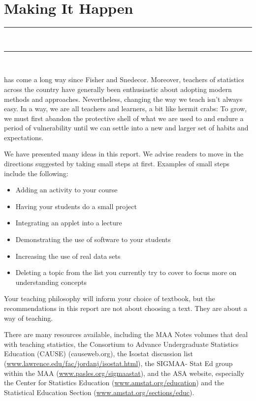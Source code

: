 \chapter{Making It Happen}
\vspace{-.53in}
   \noindent\color{graylight}\rule[0cm]{3.25in}{0.03cm} \\
    \noindent\color{graylight}\rule[0.4cm]{3.25in}{0.03cm} \\
\color{black}
\vspace{.05in}

 has come a long way since Fisher and Snedecor. Moreover, teachers of statistics across the country have generally been enthusiastic about adopting modern methods and approaches. Nevertheless, changing the way we teach isn't always easy. In a way, we are all teachers and learners, a bit like hermit crabs:  To grow, we must first abandon the protective shell of what we are used to and endure a period of vulnerability until we can settle into a new and larger set of habits and expectations. 
 
We have presented many ideas in this report.  We advise readers to move in the directions suggested by taking small steps at first.  Examples of small steps include the following:

\renewcommand{\labelitemi}{$\filledsquare$}

\begin{itemize} [leftmargin=1cm, itemsep=.2em]
\item Adding an activity to your course
\item Having your students do a small project
\item Integrating an applet into a lecture
\item Demonstrating the use of software to your students
\item Increasing the use of real data sets
\item Deleting a topic from the list you currently try to cover to focus more on understanding concepts
\end{itemize}

Your teaching philosophy will inform your choice of textbook, but the recommendations in this report are not about choosing a text.  They are about a way of teaching. 
 
There are many resources available, including the MAA Notes volumes that deal with teaching statistics, the Consortium to Advance Undergraduate Statistics Education (CAUSE) (causeweb.org), the Isostat discussion list (\url{www.lawrence.edu/fac/jordanj/isostat.html}), the SIGMAA- Stat Ed group within the MAA (\url{www.pasles.org/sigmaastat}), and the ASA website, especially the Center for Statistics Education (\url{www.amstat.org/education}) and the Statistical Education Section (\url{www.amstat.org/sections/educ}).
 
